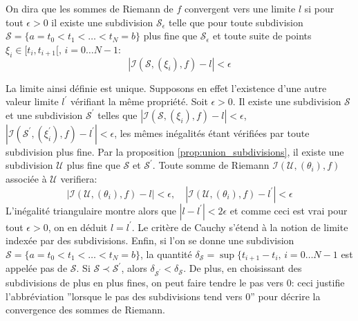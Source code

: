 \begin{defn}\label{def:lim_riemann}
On dira que les sommes de Riemann de $f$ convergent vers une limite $l$ si pour
tout $\epsilon > 0$ il existe une subdivision $\mathcal{S}_{\epsilon}$ telle que
pour toute subdivision $\mathcal{S}=\{ a = t_0 < t_1 < \dots < t_N =
b \}$ plus fine que $\mathcal{S}_{\epsilon}$ et toute suite de points $\xi_i \in
[t_i, t_{i+1}[, \, i=0 \dots N-1$:
\[
|\mathcal{I}(\mathcal{S}, (\xi_i), f)-l| < \epsilon
\]
\end{defn}
La limite ainsi définie est unique. Supposons en effet l'existence d'une autre
valeur limite $l^\prime$ vérifiant la même propriété. Soit $\epsilon > 0$. Il
existe une subdivision $\mathcal{S}$ et une subdivision $\mathcal{S}^\prime$
telles que $|\mathcal{I}(\mathcal{S}, (\xi_i), f)-l| < \epsilon$,
$|\mathcal{I}(\mathcal{S^\prime}, (\xi^\prime_i), f)-l^\prime| < \epsilon$, les
mêmes inégalités étant vérifiées par toute subdivision plus fine. Par la
proposition \ref{prop:union_subdivisions}, il existe une subdivision
$\mathcal{U}$ plus fine que $\mathcal{S}$ et $\mathcal{S}^\prime$. Toute somme
de Riemann $\mathcal{I}(\mathcal{U}, (\theta_i), f)$ associée à $\mathcal{U}$
verifiera:
\[
|\mathcal{I}(\mathcal{U}, (\theta_i), f)-l| < \epsilon, \quad
|\mathcal{I}(\mathcal{U}, (\theta_i), f)-l^\prime| < \epsilon
\]
L'inégalité triangulaire montre alors que $|l-l^\prime|<2\epsilon$ et comme ceci
est vrai pour tout $\epsilon >0$, on en déduit $l=l^\prime$.
Le critère de Cauchy s'étend à la notion de limite indexée par des subdivisions. 
Enfin, si l'on se donne une subdivision $\mathcal{S}=\{ a = t_0 < t_1 < \dots <
t_N = b \}$, la quantité $\delta_{\mathcal{S}} = \sup \{ t_{i+1}-t_i, \,
i=0\dots N-1$ est appelée pas de $\mathcal{S}$. Si $\mathcal{S} \prec
\mathcal{S}^\prime$, alors $\delta_{\mathcal{S}^\prime} < \delta_{\mathcal{S}}$.
De plus, en choisissant des subdivisions de plus en plus fines, on peut faire
tendre le pas vers 0: ceci justifie l'abbréviation ''lorsque le pas des
subdivisions tend vers 0'' pour décrire la convergence des sommes de Riemann.

